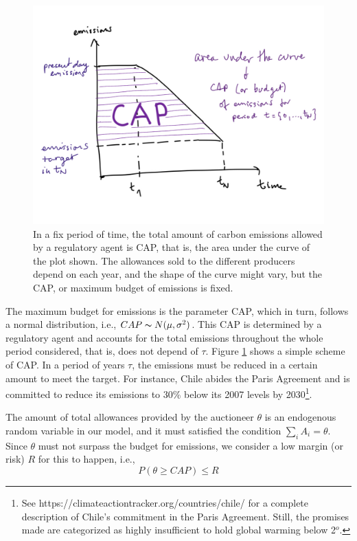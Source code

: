 \documentclass[11pt, letterpaper]{article}
\begin{document}
\begin{figure}[ht!]
 \includegraphics[width=\textwidth]{cap_scheme.jpeg}
 
 \caption{In a fix period of time, the total amount of carbon emissions allowed by a regulatory agent is CAP, that is, the area under the curve of the plot shown. The allowances sold to the different producers depend on each year, and the shape of the curve might vary, but the CAP, or maximum budget of emissions is fixed. }
 \label{cap-scheme}
\end{figure}

The maximum budget for emissions is the  parameter CAP, which in turn, follows a normal distribution, i.e., $CAP \thicksim N(\mu, \sigma^2)$. This CAP is determined by a regulatory agent and  accounts for the total emissions throughout the whole period considered, that is, does not depend of $\tau$. Figure \ref{cap-scheme} shows a simple scheme of CAP. In a period of years $\tau$, the emissions must be reduced in a certain amount to meet the target. For instance, Chile abides the Paris Agreement and is committed to reduce its emissions to 30\% below its 2007 levels by 2030\footnote{See https://climateactiontracker.org/countries/chile/ for a complete description of Chile's commitment in the Paris Agreement. Still, the promises made are categorized as highly insufficient to hold global warming below 2$^o$. }.

\smallskip
The amount of total allowances provided by the auctioneer $\theta$ is an endogenous random variable in our model, and it must satisfied the condition $\sum_i A_i = \theta$. 
Since $\theta$ must not surpass the budget for emissions, we consider a low margin (or risk) $R$ for this to happen, i.e.,
\begin{equation}
    P (\theta \geq CAP) \leq R
\end{equation}
\end{document}
